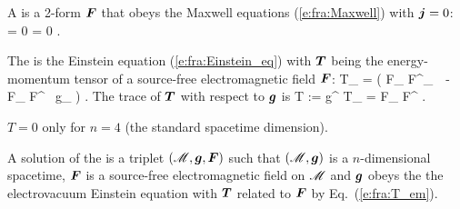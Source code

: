 A  is a 2-form $\bm{F}$
that obeys the Maxwell equations (\ref{e:fra:Maxwell}) with $\bm{j} = 0$:
\be
    \dd {} = 0 \qand  \wnab\cdot{}  = 0 .
\ee

The  is the Einstein equation (\ref{e:fra:Einstein_eq})
with $\bm{T}$ being the energy-momentum tensor of a source-free electromagnetic field
$\bm{F}$:
\be \label{e:fra:T_em}
    T_{\alpha\beta} =  \left( F_{\mu\alpha} F^\mu_{\ \, \beta}
        -  F_{\mu\nu} F^{\mu\nu} \, g_{\alpha\beta} \right) .
\ee
The trace of $\bm{T}$ with respect to $\bm{g}$ is
\be \label{e:fra:trace_T_em}
    T := g^{\mu\nu} T_{\mu\nu} =  F_{\mu\nu} F^{\mu\nu} .
\ee
\begin{remark}
$T = 0$ only for $n=4$ (the standard spacetime dimension).
\end{remark}

A solution of the 
is a triplet $(\mathscr{M},\bm{g},\bm{F})$ such that  $(\mathscr{M},\bm{g})$ is a $n$-dimensional spacetime,
$\bm{F}$ is a source-free electromagnetic field on $\mathscr{M}$ and $\bm{g}$ obeys the
the electrovacuum Einstein equation with $\bm{T}$ related to $\bm{F}$ by Eq.~(\ref{e:fra:T_em}).
